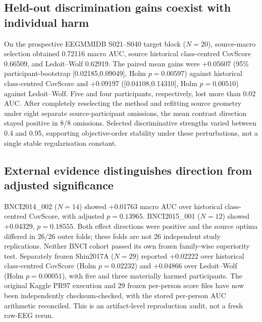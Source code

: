 \documentclass[12pt,a4paper]{article}
\begin{document}
\subsection{Held-out discrimination gains coexist with individual harm}
On the prospective EEGMMIDB S021--S040 target block (\(N=20\)),
source-macro selection obtained 0.72116 macro AUC, source
historical class-centred CovScore 0.66509, and Ledoit--Wolf 0.62919.
The paired mean gains were +0.05607 (95\% participant-bootstrap
[0.02185,0.09049], Holm \(p=0.00597\)) against historical class-centred CovScore and
+0.09197 ([0.04108,0.14310], Holm \(p=0.00510\)) against
Ledoit--Wolf. Five and four participants, respectively, lost more
than 0.02 AUC. After completely reselecting the method and refitting
source geometry under eight separate source-participant omissions,
the mean contrast direction stayed positive in 8/8 omissions.
Selected discriminative strengths varied between 0.4 and 0.95,
supporting objective-order stability under these perturbations,
not a single stable regularisation constant.

\subsection{External evidence distinguishes direction from adjusted significance}
BNCI2014\_002 (\(N=14\)) showed +0.01763 macro AUC over
historical class-centred CovScore, with adjusted \(p=0.13965\).
BNCI2015\_001 (\(N=12\)) showed +0.04329, \(p=0.18555\).
Both effect directions were positive and the source optima differed in
26/26 outer folds; these folds are not 26 independent study replications.
Neither BNCI cohort passed its own frozen family-wise superiority test.
Separately frozen Shin2017A (\(N=29\)) reported +0.02222 over
historical class-centred CovScore (Holm \(p=0.02232\)) and +0.04866 over Ledoit--Wolf
(Holm \(p=0.00051\)), with five and three materially harmed
participants. The original Kaggle PR97 execution and 29 frozen per-person
score files have now been independently checksum-checked, with
the stored per-person AUC arithmetic reconciled. This is
an artifact-level reproduction audit, not a fresh raw-EEG rerun.

















\end{document}
